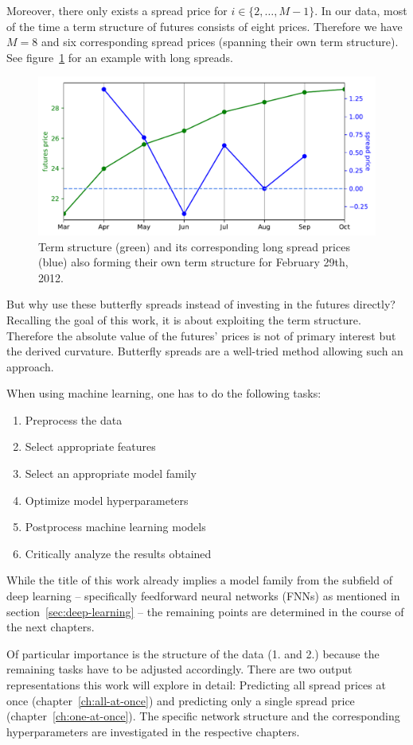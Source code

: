 Moreover, there only exists a spread price for $i \in \{2,\dots,M-1\}$. In our data, most of the time a term structure of futures consists of eight prices. Therefore we have $M=8$ and six corresponding spread prices (spanning their own term structure). See figure~\ref{fig:longspread} for an example with long spreads.

\begin{figure}
	\centering
	\includegraphics[width=0.8\linewidth]{images/long_spread}
	\caption[Term structure and corresponding spread prices from Feb 29, 2012]{%
		Term structure (green) and its corresponding long spread prices (blue) also forming their own term structure for February 29th, 2012.}
	\label{fig:longspread}
\end{figure}

But why use these butterfly spreads instead of investing in the futures directly? Recalling the goal of this work, it is about exploiting the term structure. Therefore the absolute value of the futures' prices is not of primary interest but the derived curvature. Butterfly spreads are a well-tried method allowing such an approach.

\newpage

When using machine learning, one has to do the following tasks: \cite{automl-2017}

\begin{enumerate}
	\item Preprocess the data
	\item Select appropriate features
	\item Select an appropriate model family
	\item Optimize model hyperparameters
	\item Postprocess machine learning models
	\item Critically analyze the results obtained
\end{enumerate}

While the title of this work already implies a model family from the subfield of deep learning -- specifically feedforward neural networks (FNNs) as mentioned in section~\ref{sec:deep-learning} -- the remaining points are determined in the course of the next chapters.

Of particular importance is the structure of the data (1. and 2.) because the remaining tasks have to be adjusted accordingly. There are two output representations this work will explore in detail: Predicting all spread prices at once (chapter~\ref{ch:all-at-once}) and predicting only a single spread price (chapter~\ref{ch:one-at-once}). The specific network structure and the corresponding hyperparameters are investigated in the respective chapters.